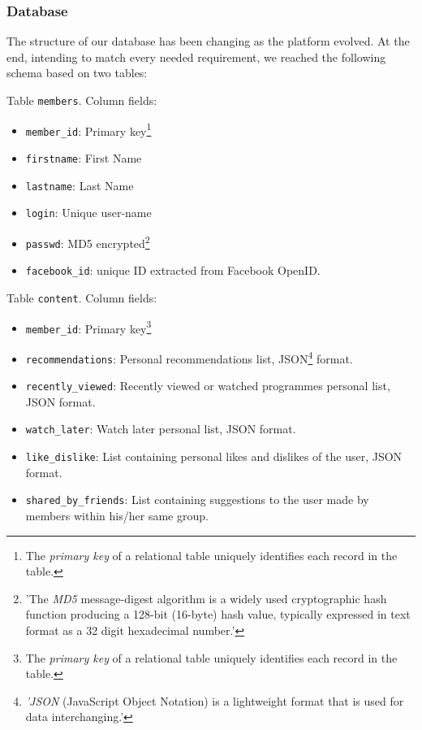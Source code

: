 \documentclass{acm_proc_article-sp}
\begin{document}
\subsubsection{Database}

The structure of our database has been changing as the platform evolved. At the end, intending to match every needed requirement, we reached the following schema based on two tables:

Table \texttt{members}. Column fields:

\begin{itemize}
\item \texttt{member\_id}: Primary key\footnote{The \textit{primary key} of a relational table uniquely identifies each record in the table.}
\item \texttt{firstname}: First Name
\item \texttt{lastname}: Last Name
\item \texttt{login}: Unique user-name
\item \texttt{passwd}: MD5 encrypted\cite{wiki:md5}\footnote{'The \textit{MD5} message-digest algorithm is a widely used cryptographic hash function producing a 128-bit (16-byte) hash value, typically expressed in text format as a 32 digit hexadecimal number.'}
\item \texttt{facebook\_id}: unique ID extracted from Facebook OpenID.
\end{itemize}

Table \texttt{content}. Column fields:

\begin{itemize}
\item \texttt{member\_id}: Primary key\footnote{The \textit{primary key} of a relational table uniquely identifies each record in the table.}
\item \texttt{recommendations}: Personal recommendations list, JSON\footnote{\textit{'JSON} (JavaScript Object Notation) is a lightweight format that is used for data interchanging.'} format.
\item \texttt{recently\_viewed}: Recently viewed or watched programmes personal list, JSON format.
\item \texttt{watch\_later}: Watch later personal list, JSON format.
\item \texttt{like\_dislike}: List containing personal likes and dislikes of the user, JSON format.
\item \texttt{shared\_by\_friends}: List containing suggestions to the user made by members within his/her same group. 
\end{itemize}
\end{document}
